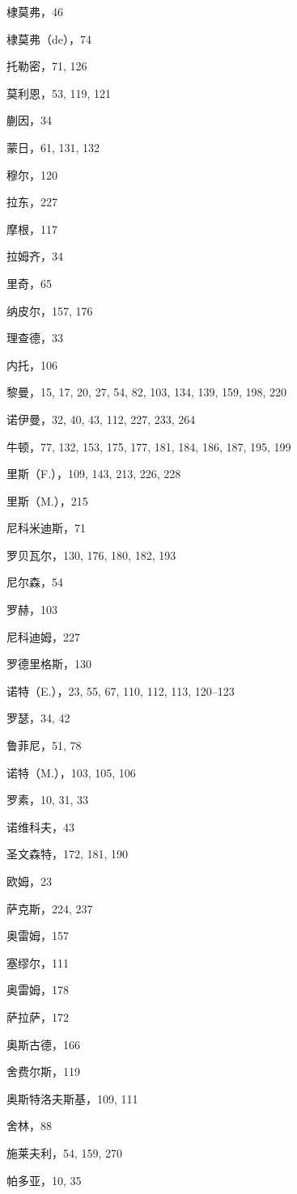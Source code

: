 棣莫弗，46

棣莫弗（de），74

托勒密，71, 126

莫利恩，53, 119, 121

蒯因，34

蒙日，61, 131, 132

穆尔，120

拉东，227

摩根，117

拉姆齐，34

里奇，65

纳皮尔，157, 176

理查德，33

内托，106

黎曼，15, 17, 20, 27, 54, 82, 103, 134, 139, 159, 198, 220

诺伊曼，32, 40, 43, 112, 227, 233, 264

牛顿，77, 132, 153, 175, 177, 181, 184, 186, 187, 195, 199

里斯（F.），109, 143, 213, 226, 228

里斯（M.），215

尼科米迪斯，71

罗贝瓦尔，130, 176, 180, 182, 193

尼尔森，54

罗赫，103

尼科迪姆，227

罗德里格斯，130

诺特（E.），23, 55, 67, 110, 112, 113, 120--123

罗瑟，34, 42

鲁菲尼，51, 78

诺特（M.），103, 105, 106

罗素，10, 31, 33

诺维科夫，43

圣文森特，172, 181, 190

欧姆，23

萨克斯，224, 237

奥雷姆，157

塞缪尔，111

奥雷姆，178

萨拉萨，172

奥斯古德，166

舍费尔斯，119

奥斯特洛夫斯基，109, 111

舍林，88

施莱夫利，54, 159, 270

帕多亚，10, 35

